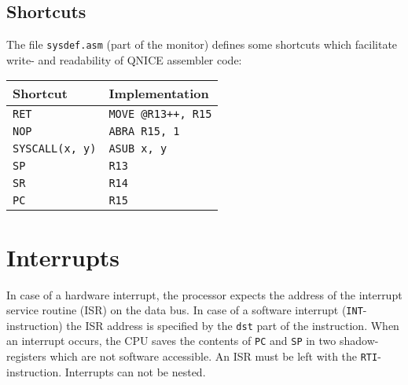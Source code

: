 \documentclass{leaflet}
\begin{document}
  \subsection{Shortcuts}
   The file \texttt{sysdef.asm} (part of the monitor) defines some shortcuts
   which facilitate write- and readability of QNICE assembler code:
   \vspace*{-3mm}
   \begin{center}
    \begin{longtable}{|l|l|}
     \hline
      Shortcut&Implementation\\
     \hline
     \hline
      \texttt{RET}&\texttt{MOVE @R13++, R15}\\
      \texttt{NOP}&\texttt{ABRA R15, 1}\\
      \texttt{SYSCALL(x, y)}&\texttt{ASUB x, y}\\
     \hline
      \texttt{SP}&\texttt{R13}\\
      \texttt{SR}&\texttt{R14}\\
      \texttt{PC}&\texttt{R15}\\
     \hline
    \end{longtable}
   \end{center}
   \vspace*{-15mm}
%
 \section{Interrupts}
  In case of a hardware interrupt, the processor expects the address of the 
  interrupt service routine (ISR) on the data bus. In case of a software
  interrupt (\texttt{INT}-instruction) the ISR address is specified by the 
  \texttt{dst} part of the instruction. When an interrupt occurs, the CPU
  saves the contents of \texttt{PC} and \texttt{SP} in two shadow-registers
  which are not software accessible. An ISR must be left with the 
  \texttt{RTI}-instruction. Interrupts can not be nested.
%
\end{document}

